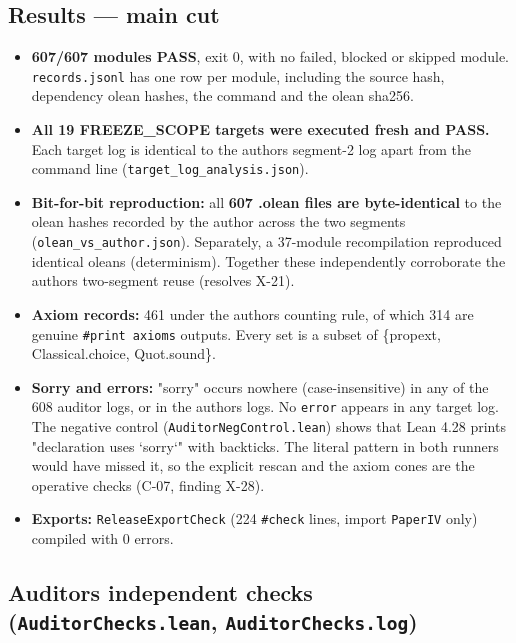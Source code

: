 \documentclass[
]{article}
\providecommand{\tightlist}{%
  \setlength{\itemsep}{0pt}\setlength{\parskip}{0pt}}
\begin{document}
\subsection{Results --- main cut}\label{results--main-cut}

\begin{itemize}
\tightlist
\item
  \textbf{607/607 modules PASS}, exit 0, with no failed, blocked or
  skipped module. \texttt{records.jsonl} has one row per module,
  including the source hash, dependency olean hashes, the command and
  the olean sha256.
\item
  \textbf{All 19 FREEZE\_SCOPE targets were executed fresh and PASS.}
  Each target log is identical to the author\textquotesingle s segment-2
  log apart from the command line (\texttt{target\_log\_analysis.json}).
\item
  \textbf{Bit-for-bit reproduction:} all \textbf{607 .olean files are
  byte-identical} to the olean hashes recorded by the author across the
  two segments (\texttt{olean\_vs\_author.json}). Separately, a
  37-module recompilation reproduced identical oleans (determinism).
  Together these independently corroborate the author\textquotesingle s
  two-segment reuse (resolves X-21).
\item
  \textbf{Axiom records:} 461 under the author\textquotesingle s
  counting rule, of which 314 are genuine \texttt{\#print\ axioms}
  outputs. Every set is a subset of \{propext, Classical.choice,
  Quot.sound\}.
\item
  \textbf{Sorry and errors:} "sorry" occurs nowhere (case-insensitive)
  in any of the 608 auditor logs, or in the author\textquotesingle s
  logs. No \texttt{error} appears in any target log. The negative
  control (\texttt{AuditorNegControl.lean}) shows that Lean 4.28 prints
  "declaration uses `sorry`" with backticks. The literal pattern in both
  runners would have missed it, so the explicit rescan and the axiom
  cones are the operative checks (C-07, finding X-28).
\item
  \textbf{Exports:} \texttt{ReleaseExportCheck} (224 \texttt{\#check}
  lines, import \texttt{PaperIV} only) compiled with 0 errors.
\end{itemize}

\subsection{\texorpdfstring{Auditor\textquotesingle s independent checks
(\texttt{AuditorChecks.lean},
\texttt{AuditorChecks.log})}{Auditor\textquotesingle s independent checks (AuditorChecks.lean, AuditorChecks.log)}}\label{auditors-independent-checks-auditorcheckslean-auditorcheckslog}
\end{document}
